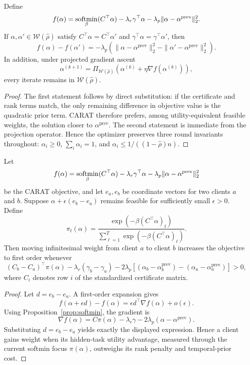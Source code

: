 \begin{proposition}
\label{prop:temporal-prior}
Define
\[
f(\alpha)=\operatorname*{softmin}_{\beta}(C^\top\alpha)-\lambda_r \gamma^\top\alpha-\lambda_p\|\alpha-\alpha^{\mathrm{prev}}\|_2^2.
\]
If $\alpha,\alpha' \in \mathcal{W}(\hat{\rho})$ satisfy $C^\top\alpha=C^\top\alpha'$ and $\gamma^\top\alpha=\gamma^\top\alpha'$, then
\[
f(\alpha)-f(\alpha')
=
-\lambda_p\!\left(\|\alpha-\alpha^{\mathrm{prev}}\|_2^2-\|\alpha'-\alpha^{\mathrm{prev}}\|_2^2\right).
\]
In addition, under projected gradient ascent
\[
\alpha^{(k+1)}=\Pi_{\mathcal{W}(\hat{\rho})}\!\left(\alpha^{(k)}+\eta \nabla f(\alpha^{(k)})\right),
\]
every iterate remains in $\mathcal{W}(\hat{\rho})$.
\end{proposition}

\begin{proof}
The first statement follows by direct substitution: if the certificate and rank terms match, the only remaining difference in objective value is the quadratic prior term. CARAT therefore prefers, among utility-equivalent feasible weights, the solution closer to $\alpha^{\mathrm{prev}}$. The second statement is immediate from the projection operator. Hence the optimizer preserves three round invariants throughout: $\alpha_i \ge 0$, $\sum_i \alpha_i =1$, and $\alpha_i \le 1/((1-\hat{\rho})n)$.
\end{proof}

\begin{proposition}
\label{prop:pairwise-transfer}
Let
\[
f(\alpha)=\operatorname*{softmin}_{\beta}(C^\top\alpha)-\lambda_r \gamma^\top\alpha-\lambda_p\|\alpha-\alpha^{\mathrm{prev}}\|_2^2
\]
be the CARAT objective, and let $e_a,e_b$ be coordinate vectors for two clients $a$ and $b$. Suppose $\alpha+\epsilon(e_b-e_a)$ remains feasible for sufficiently small $\epsilon>0$. Define
\[
\pi_t(\alpha)=\frac{\exp(-\beta (C^\top\alpha)_t)}
{\sum_{\ell=1}^T \exp(-\beta (C^\top\alpha)_\ell)}.
\]
Then moving infinitesimal weight from client $a$ to client $b$ increases the objective to first order whenever
\[
(C_b-C_a)^\top \pi(\alpha)
-\lambda_r(\gamma_b-\gamma_a)
-2\lambda_p\!\left[
(\alpha_b-\alpha_b^{\mathrm{prev}})
-(\alpha_a-\alpha_a^{\mathrm{prev}})
\right] > 0,
\]
where $C_i$ denotes row $i$ of the standardized certificate matrix.
\end{proposition}

\begin{proof}
Let $d=e_b-e_a$. A first-order expansion gives
\[
f(\alpha+\epsilon d)-f(\alpha)
=\epsilon d^\top\nabla f(\alpha)+o(\epsilon).
\]
Using Proposition~\ref{prop:softmin}, the gradient is
\[
\nabla f(\alpha)=C\pi(\alpha)-\lambda_r \gamma-2\lambda_p(\alpha-\alpha^{\mathrm{prev}}).
\]
Substituting $d=e_b-e_a$ yields exactly the displayed expression. Hence a client gains weight when its hidden-task utility advantage, measured through the current softmin focus $\pi(\alpha)$, outweighs its rank penalty and temporal-prior cost.
\end{proof}

